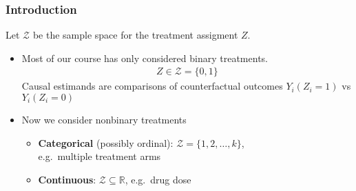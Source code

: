 



\begin{frame}
  \frametitle{Introduction}



  Let $\mathcal{Z}$ be the sample space for the treatment assigment
  $Z$.

  \bigskip 

  \begin{itemize}
  \item Most of our course has only considered binary treatments.  
    \begin{align*}
      Z \in \mathcal{Z} = \{0, 1 \}
    \end{align*}
    Causal estimands are comparisons of counterfactual outcomes
    $Y_i(Z_i = 1)$ vs $Y_i(Z_i = 0)$ \medskip
  \item Now we consider nonbinary treatments \medskip 
    \begin{itemize}
    \item \textbf{Categorical} (possibly ordinal):
      $\mathcal{Z} = \{1, 2, \ldots, k \}$,\\  e.g.~multiple treatment
      arms \medskip 
    \item \textbf{Continuous}: $\mathcal{Z} \subseteq \mathbb{R}$,
      e.g.~drug dose \medskip 
    \end{itemize}

  \end{itemize}




\end{frame}


